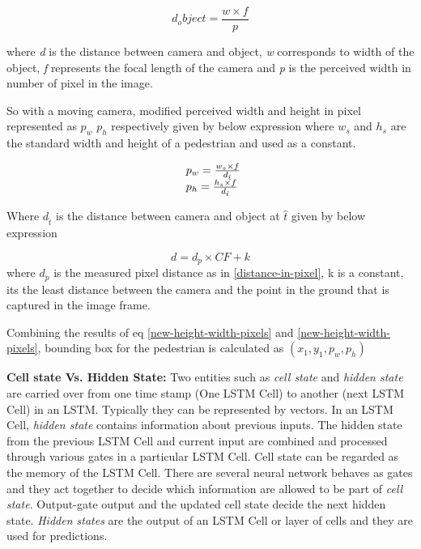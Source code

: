 \begin{equation} \label{distance-camera-object}
d_object = \frac{w \times f}{p}
\end{equation} 

where \textit{d} is the distance between camera and object, \textit{w} corresponds to width of the object, \textit{f} represents the focal length of the camera and \textit{p} is the perceived width in number of pixel in the image.

So with a moving camera, modified perceived width and height in pixel represented as ${p_w}$ ${p_h}$ respectively given by below expression where $w_s$ and $h_s$ are the standard width and height of a pedestrian and used as a constant.

\begin{equation} \label{new-height-width-pixels}
\begin{array}{l@{}}
{p_w} = \frac{w_s \times f}{d_{\hat{t}}} \\
{p_h} = \frac{h_s \times f}{d_{\hat{t}}}
\end{array}			
\end{equation} 

Where ${d_{\hat{t}}}$ is the distance between camera and object at ${\hat{t}}$ given by below expression

\begin{equation}
d = d_p \times {CF} + k
\end{equation}
where $d_p$ is the measured pixel distance as in \ref{distance-in-pixel}, k is a constant, its the least distance between the camera and the point in the ground that is captured in the image frame.

Combining the results of eq \ref{new-height-width-pixels} and \ref{new-height-width-pixels}, bounding box for the pedestrian is calculated as $({x_1}, {y_1},{p_w}, {p_h})$


\textbf{Cell state Vs. Hidden State:}
Two entities such as \textit{cell state} and \textit{hidden state} are carried over from one time stamp (One LSTM Cell) to another (next LSTM Cell) in an LSTM. Typically they can be represented by vectors. In an LSTM Cell, \textit{hidden state }contains information about previous inputs. The hidden state from the previous LSTM Cell and current input are combined and processed through various gates in a particular LSTM Cell. Cell state can be regarded as the memory of the LSTM Cell. There are several neural network behaves as gates and they act together to decide which information are allowed to be part of \textit{cell state}. Output-gate output and the updated cell state decide the next hidden state. \textit{Hidden states} are the output of an LSTM Cell or layer of cells and they are used for predictions.  

